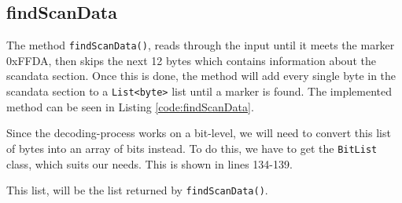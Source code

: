 \subsection{findScanData}
The method \lstinline|findScanData()|, reads through the input until it meets the marker 0xFFDA, then skips the next 12 bytes which contains information about the scandata section.
Once this is done, the method will add every single byte in the scandata section to a \lstinline|List<byte>| list until a marker is found. The implemented method can be seen in Listing \ref{code:findScanData}.

Since the decoding-process works on a bit-level, we will need to convert this list of bytes into an array of bits instead. To do this, we have to get the \lstinline|BitList| class, which suits our needs. This is shown in lines 134-139.

This list, will be the list returned by \lstinline|findScanData()|.
